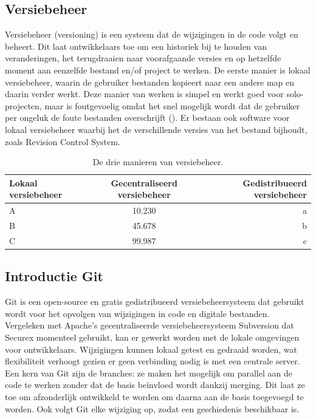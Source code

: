 \subsection{Versiebeheer}
Versiebeheer (versioning) is een systeem dat de wijzigingen in de code volgt en beheert. Dit laat ontwikkelaars toe om een historiek bij te houden van veranderingen, het terugdraaien naar voorafgaande versies en op hetzelfde moment aan eenzelfde bestand en/of project te werken. De eerste manier is lokaal versiebeheer, waarin de gebruiker bestanden kopieert naar een andere map en daarin verder werkt. Deze manier van werken is simpel en werkt goed voor solo-projecten, maar is foutgevoelig omdat het snel mogelijk wordt dat de gebruiker per ongeluk de foute bestanden overschrijft (\cite{Chacon2014}). Er bestaan ook software voor lokaal versiebeheer waarbij het de verschillende versies van het bestand bijhoudt, zoals Revision Control System.



\begin{table}
  \centering
  \begin{tabular}{lcr}
        \toprule
        \textbf{Lokaal versiebeheer} & \textbf{Gecentraliseerd versiebeheer} & \textbf{Gedistribueerd versiebeheer} \\
        \midrule
        A                & 10.230           & a                \\
        B                & 45.678           & b                \\
        C                & 99.987           & c                \\
        \bottomrule
      \end{tabular}
  \caption[Versiebeheertabel]{\label{tab:example}De drie manieren van versiebeheer.}
\end{table}

\subsection{Introductie Git}
Git is een open-source en gratis gedistribueerd versiebeheersysteem dat gebruikt wordt voor het opvolgen van wijzigingen in code en digitale bestanden. Vergeleken met Apache's gecentraliseerde versiebeheersysteem Subversion dat Securex momenteel gebruikt, kan er gewerkt worden met de lokale omgevingen voor ontwikkelaars. Wijzigingen kunnen lokaal getest en gedraaid worden, wat flexibiliteit verhoogt gezien er geen verbinding nodig is met een centrale server. Een kern van Git zijn de branches: ze maken het mogelijk om parallel aan de code te werken zonder dat de basis beïnvloed wordt dankzij merging. Dit laat ze toe om afzonderlijk ontwikkeld te worden om daarna aan de basis toegevoegd te worden. Ook volgt Git elke wijziging op, zodat een geschiedenis beschikbaar is. 

